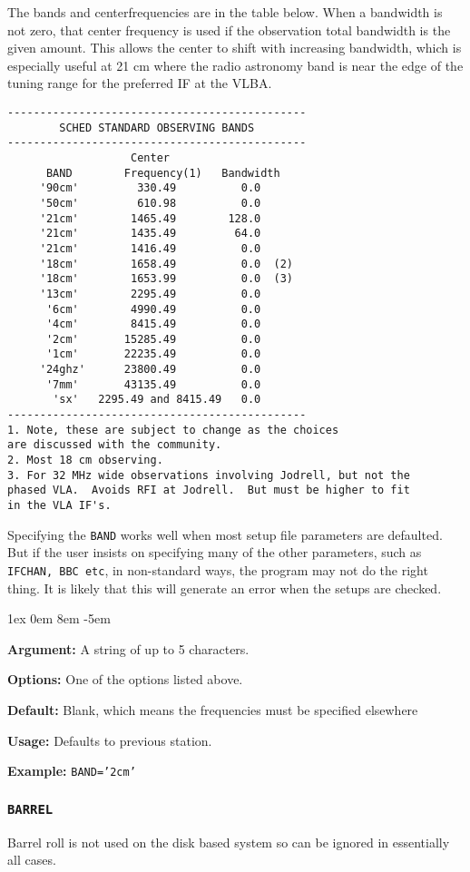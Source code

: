 \documentclass{report}
\newcommand{\rcwbox}[5]{
  \begin{list}{}{\parsep 1ex  \itemsep 0em
                 \leftmargin 8em  \itemindent -5em }
    \item {\bf Argument:} #1
    \item {\bf Options:}  #2
    \item {\bf Default:}  #3
    \item {\bf Usage:}    #4
    \item {\bf Example:}  #5
  \end{list}
}
\begin{document}
The bands and centerfrequencies are in the table below.  When a
bandwidth is not zero, that center frequency is used if the
observation total bandwidth is the given amount.  This allows
the center to shift with increasing bandwidth, which is especially
useful at 21 cm where the radio astronomy band is near the edge
of the tuning range for the preferred IF at the VLBA.

\begin{verbatim}
----------------------------------------------
        SCHED STANDARD OBSERVING BANDS
----------------------------------------------
                   Center
      BAND        Frequency(1)   Bandwidth
     '90cm'         330.49          0.0
     '50cm'         610.98          0.0
     '21cm'        1465.49        128.0
     '21cm'        1435.49         64.0
     '21cm'        1416.49          0.0
     '18cm'        1658.49          0.0  (2)
     '18cm'        1653.99          0.0  (3)
     '13cm'        2295.49          0.0
      '6cm'        4990.49          0.0
      '4cm'        8415.49          0.0
      '2cm'       15285.49          0.0
      '1cm'       22235.49          0.0
     '24ghz'      23800.49          0.0
      '7mm'       43135.49          0.0
       'sx'   2295.49 and 8415.49   0.0
----------------------------------------------
1. Note, these are subject to change as the choices
are discussed with the community.
2. Most 18 cm observing.
3. For 32 MHz wide observations involving Jodrell, but not the
phased VLA.  Avoids RFI at Jodrell.  But must be higher to fit
in the VLA IF's.
\end{verbatim}

Specifying the {\tt BAND} works well when most setup file parameters
are defaulted.  But if the user insists on specifying many of the
other parameters, such as {\tt IFCHAN, BBC etc}, in non-standard
ways, the program may not do the right thing.  It is likely that
this will generate an error when the setups are checked.

\rcwbox
{A string of up to 5 characters.}
{One of the options listed above.}
{Blank, which means the frequencies must be specified elsewhere}
{Defaults to previous station.}
{{\tt BAND='2cm'}}

\subsubsection{\label{SP:BARREL}{\tt BARREL}}

Barrel roll is not used on the disk based system so can be
ignored in essentially all cases.
\end{document}
